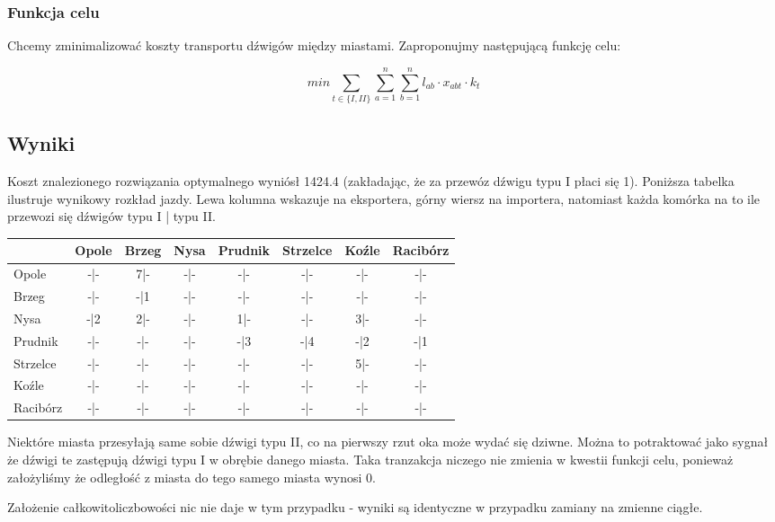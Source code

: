 \documentclass{article}
\theoremstyle{definition}
\theoremstyle{remark}
\theoremstyle{plain}
\theoremstyle{remark}
\theoremstyle{plain}
\begin{document}
\subsubsection{Funkcja celu}
Chcemy zminimalizować koszty transportu dźwigów między miastami. Zaproponujmy następującą funkcję celu:

\[ min {\sum_{t \in \{I,II\}}{\sum_{a=1}^{n}{\sum_{b=1}^{n}{l_{ab} \cdot x_{abt} \cdot k_t}}}} \]

\subsection{Wyniki}
Koszt znalezionego rozwiązania optymalnego wyniósł 1424.4 (zakładając, że za przewóz dźwigu typu I płaci się 1).
Poniższa tabelka ilustruje wynikowy rozkład jazdy. Lewa kolumna wskazuje na eksportera, górny wiersz na importera,
natomiast każda komórka na to ile przewozi się dźwigów typu I | typu II.

\begin{table}[H]
    \centering
    \begin{tabular}{|l|c|c|c|c|c|c|c|} \hline
     & Opole & Brzeg & Nysa & Prudnik & Strzelce & Koźle & Racibórz\\\hline
    Opole & -|- & 7|- & -|- & -|- & -|- & -|- & -|-\\\hline
    Brzeg & -|- & -|1 & -|- & -|- & -|- & -|- & -|-\\\hline
    Nysa & -|2 & 2|- & -|- & 1|- & -|- & 3|- & -|-\\\hline
    Prudnik & -|- & -|- & -|- & -|3 & -|4 & -|2 & -|1\\\hline
    Strzelce & -|- & -|- & -|- & -|- & -|- & 5|- & -|-\\\hline
    Koźle & -|- & -|- & -|- & -|- & -|- & -|- & -|-\\\hline
    Racibórz & -|- & -|- & -|- & -|- & -|- & -|- & -|-\\\hline
    \end{tabular}
\end{table}

Niektóre miasta przesyłają same sobie dźwigi typu II, co na pierwszy rzut oka może wydać się dziwne.
Można to potraktować jako sygnał że dźwigi te zastępują dźwigi typu I w obrębie danego miasta.
Taka tranzakcja niczego nie zmienia w kwestii funkcji celu, ponieważ założyliśmy że odległość z miasta do tego samego miasta wynosi 0.

Założenie całkowitoliczbowości nic nie daje w tym przypadku - wyniki są identyczne w przypadku zamiany na zmienne ciągłe.
\end{document}
